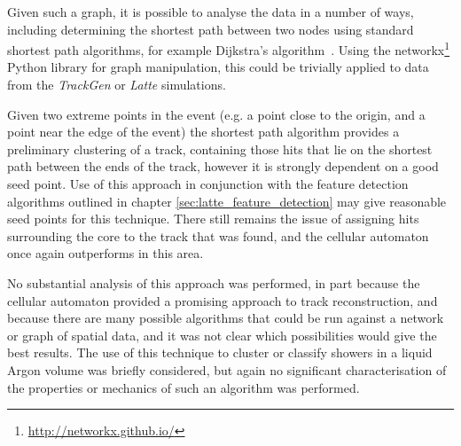 Given such a graph, it is possible to analyse the data in a number of ways, including determining the shortest path between two nodes using standard shortest path algorithms, for example Dijkstra's algorithm~\citep{Dijkstra1959}. Using the networkx\footnote{\url{http://networkx.github.io/}} Python library for graph manipulation, this could be trivially applied to data from the \emph{TrackGen} or \emph{Latte} simulations.

Given two extreme points in the event (e.g. a point close to the origin, and a point near the edge of the event) the shortest path algorithm provides a preliminary clustering of a track, containing those hits that lie on the shortest path between the ends of the track, however it is strongly dependent on a good seed point. Use of this approach in conjunction with the feature detection algorithms outlined in chapter \ref{sec:latte_feature_detection} may give reasonable seed points for this technique. There still remains the issue of assigning hits surrounding the core to the track that was found, and the cellular automaton once again outperforms in this area.

No substantial analysis of this approach was performed, in part because the cellular automaton provided a promising approach to track reconstruction, and because there are many possible algorithms that could be run against a network or graph of spatial data, and it was not clear which possibilities would give the best results. The use of this technique to cluster or classify showers in a liquid Argon volume was briefly considered, but again no significant characterisation of the properties or mechanics of such an algorithm was performed.

